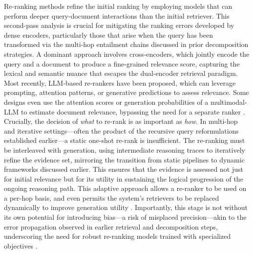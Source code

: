 \documentclass[11pt,a4paper]{article}
\begin{document}
Re-ranking methods refine the initial ranking by employing models that can perform deeper query-document interactions than the initial retriever. This second-pass analysis is crucial for mitigating the ranking errors developed by dense encoders, particularly those that arise when the query has been transformed via the multi-hop entailment chains discussed in prior decomposition strategies. A dominant approach involves cross-encoders, which jointly encode the query and a document to produce a fine-grained relevance score, capturing the lexical and semantic nuance that escapes the dual-encoder retrieval paradigm. Most recently, LLM-based re-rankers have been proposed, which can leverage prompting, attention patterns, or generative predictions to assess relevance. Some designs even use the attention scores or generation probabilities of a multimodal-LLM to estimate document relevance, bypassing the need for a separate ranker \cite{arxiv:2508.13828v1}. Crucially, the decision of \emph{what} to re-rank is as important as \emph{how}. In multi-hop and iterative settings---often the product of the recursive query reformulations established earlier---a static one-shot re-rank is insufficient. The re-ranking must be interleaved with generation, using intermediate reasoning traces to iteratively refine the evidence set, mirroring the transition from static pipelines to dynamic frameworks discussed earlier. This ensures that the evidence is assessed not just for initial relevance but for its utility in sustaining the logical progression of the ongoing reasoning path. This adaptive approach allows a re-ranker to be used on a per-hop basis, and even permits the system's retrievers to be replaced dynamically to improve generation utility \cite{arxiv:2604.22849v1}. Importantly, this stage is not without its own potential for introducing bias---a risk of misplaced precision---akin to the error propagation observed in earlier retrieval and decomposition steps, underscoring the need for robust re-ranking models trained with specialized objectives \cite{arxiv:2601.13227v2}.
\end{document}
